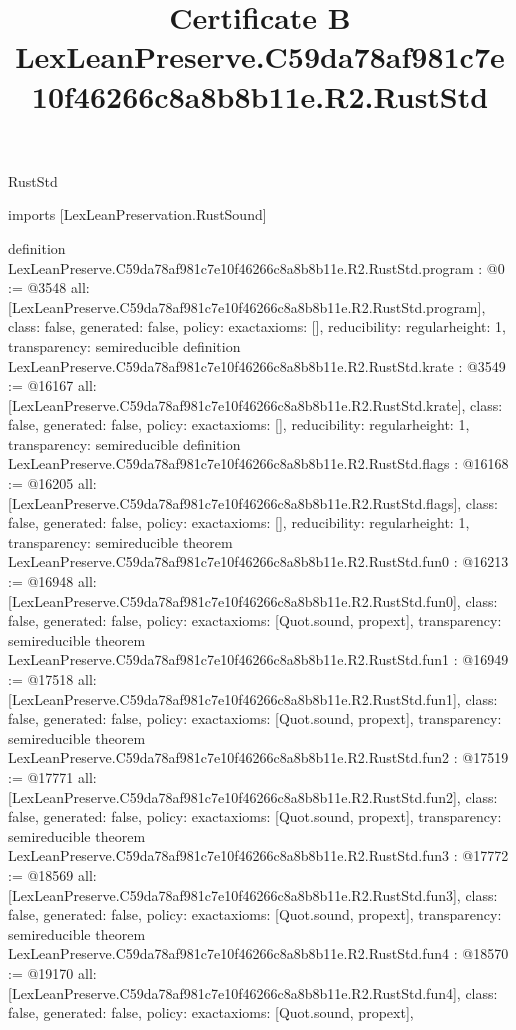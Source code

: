 \begin{lexlean}{RustStd}
\title{Certificate B LexLeanPreserve.C59da78af981c7e10f46266c8a8b8b11e.R2.RustStd}
\begin{coremodule}
imports [LexLeanPreservation.RustSound]

definition LexLeanPreserve.C59da78af981c7e10f46266c8a8b8b11e.R2.RustStd.program : @0 := @3548 {
  all: [LexLeanPreserve.C59da78af981c7e10f46266c8a8b8b11e.R2.RustStd.program],
  class: false,
  generated: false,
  policy: exact{axioms: []},
  reducibility: regular{height: 1},
  transparency: semireducible
}
definition LexLeanPreserve.C59da78af981c7e10f46266c8a8b8b11e.R2.RustStd.krate : @3549 := @16167 {
  all: [LexLeanPreserve.C59da78af981c7e10f46266c8a8b8b11e.R2.RustStd.krate],
  class: false,
  generated: false,
  policy: exact{axioms: []},
  reducibility: regular{height: 1},
  transparency: semireducible
}
definition LexLeanPreserve.C59da78af981c7e10f46266c8a8b8b11e.R2.RustStd.flags : @16168 := @16205 {
  all: [LexLeanPreserve.C59da78af981c7e10f46266c8a8b8b11e.R2.RustStd.flags],
  class: false,
  generated: false,
  policy: exact{axioms: []},
  reducibility: regular{height: 1},
  transparency: semireducible
}
theorem LexLeanPreserve.C59da78af981c7e10f46266c8a8b8b11e.R2.RustStd.fun0 : @16213 := @16948 {
  all: [LexLeanPreserve.C59da78af981c7e10f46266c8a8b8b11e.R2.RustStd.fun0],
  class: false,
  generated: false,
  policy: exact{axioms: [Quot.sound, propext]},
  transparency: semireducible
}
theorem LexLeanPreserve.C59da78af981c7e10f46266c8a8b8b11e.R2.RustStd.fun1 : @16949 := @17518 {
  all: [LexLeanPreserve.C59da78af981c7e10f46266c8a8b8b11e.R2.RustStd.fun1],
  class: false,
  generated: false,
  policy: exact{axioms: [Quot.sound, propext]},
  transparency: semireducible
}
theorem LexLeanPreserve.C59da78af981c7e10f46266c8a8b8b11e.R2.RustStd.fun2 : @17519 := @17771 {
  all: [LexLeanPreserve.C59da78af981c7e10f46266c8a8b8b11e.R2.RustStd.fun2],
  class: false,
  generated: false,
  policy: exact{axioms: [Quot.sound, propext]},
  transparency: semireducible
}
theorem LexLeanPreserve.C59da78af981c7e10f46266c8a8b8b11e.R2.RustStd.fun3 : @17772 := @18569 {
  all: [LexLeanPreserve.C59da78af981c7e10f46266c8a8b8b11e.R2.RustStd.fun3],
  class: false,
  generated: false,
  policy: exact{axioms: [Quot.sound, propext]},
  transparency: semireducible
}
theorem LexLeanPreserve.C59da78af981c7e10f46266c8a8b8b11e.R2.RustStd.fun4 : @18570 := @19170 {
  all: [LexLeanPreserve.C59da78af981c7e10f46266c8a8b8b11e.R2.RustStd.fun4],
  class: false,
  generated: false,
  policy: exact{axioms: [Quot.sound, propext]},
}
\end{coremodule}
\end{lexlean}
